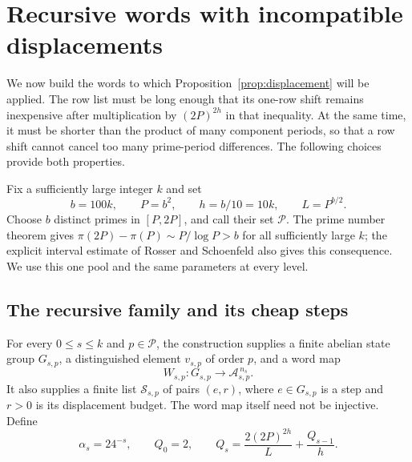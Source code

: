 \section{Recursive words with incompatible displacements}
\label{sec:construction}

We now build the words to which Proposition~\ref{prop:displacement}
will be applied. The row list must be long enough that its one-row shift
remains inexpensive after multiplication by $(2P)^{2h}$ in that
inequality. At the same time, it must be shorter than the
product of many component periods, so that a row shift cannot cancel
too many prime-period differences. The following choices provide both
properties.

Fix a sufficiently large integer $k$ and set
\begin{equation}\label{eq:parameters}
 b=100k,\qquad P=b^2,\qquad h=b/10=10k,\qquad L=P^{b/2}.
\end{equation}
Choose $b$ distinct primes in $[P,2P]$, and call their set
$\mathcal P$. The prime number theorem gives
$\pi(2P)-\pi(P)\sim P/\log P>b$ for all sufficiently large $k$;
the explicit interval estimate of Rosser and Schoenfeld
\cite[Corollary~3, equation~(3.8)]{RosserSchoenfeld1962} also gives
this consequence. We use this one pool and the same parameters at
every level.

\subsection{The recursive family and its cheap steps}

For every $0\le s\le k$ and $p\in\mathcal P$, the construction supplies
a finite abelian state group $G_{s,p}$, a distinguished element
$v_{s,p}$ of order $p$, and a word map
\[
 W_{s,p}:G_{s,p}\longrightarrow\mathcal A_{s,p}^{\,n_s}.
\]
It also supplies a finite list $\mathcal S_{s,p}$ of pairs $(e,r)$,
where $e\in G_{s,p}$ is a step and $r>0$ is its displacement budget.
The word map itself need not be injective. Define
\begin{equation}\label{eq:recurrences}
 \alpha_s=24^{-s},\qquad Q_0=2,\qquad
 Q_s=\frac{2(2P)^{2h}}{L}+\frac{Q_{s-1}}h.
\end{equation}

